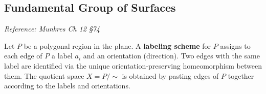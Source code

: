 \documentclass[11pt]{report}
\begin{document}
\subsection{Fundamental Group of Surfaces}

\textit{Reference: Munkres Ch 12 \S 74}

\begin{defbox}
Let $P$ be a polygonal region in the plane. A \textbf{labeling scheme} for $P$ assigns to each edge of $P$ a label $a_i$ and an orientation (direction). Two edges with the same label are identified via the unique orientation-preserving homeomorphism between them. The quotient space $X = P/{\sim}$ is obtained by pasting edges of $P$ together according to the labels and orientations.
\end{defbox}
\end{document}
